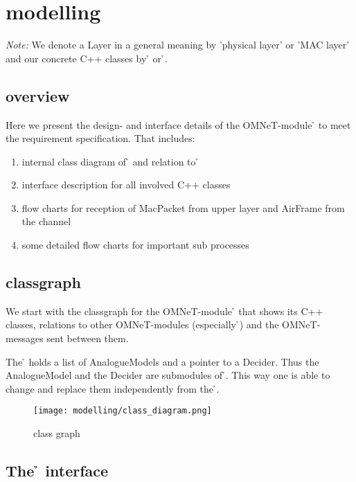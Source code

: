 \section{modelling}

\emph{Note: }We denote a Layer in a general meaning by 'physical layer' 
or 'MAC layer' and our concrete C++ classes by \h{\bp} or \h{\bm}.

\subsection{overview}

Here we present the design- and interface details of the OMNeT-module 
\h{\bp} to meet the requirement specification. That includes:

\begin{enumerate}
 \item internal class diagram of \h{\bp} and relation to \h{\bm}
 \item interface description for all involved C++ classes
 \item flow charts for reception of MacPacket from upper layer and 
 AirFrame from the channel
 \item some detailed flow charts for important sub processes
\end{enumerate}


\subsection{classgraph}

We start with the classgraph for the OMNeT-module \h{\bp} that shows 
its C++ classes, relations to other OMNeT-modules (especially \h{\bm})
and the OMNeT-messages sent between them.

The \h{\bp} holds a list of AnalogueModels and a pointer to a
Decider. Thus the AnalogueModel and the Decider are submodules of \h{\bp}. This
way one is able to change and
replace them independently from
the \h{\bp}.

\begin{landscape}
\begin{figure}
 \centering
 \texttt{[image: modelling/class\_diagram.png]}
 \caption{class graph}
 \label{fig: classgraph}
\end{figure}
\end{landscape} 

\subsection{The \h{\bp} interface}

